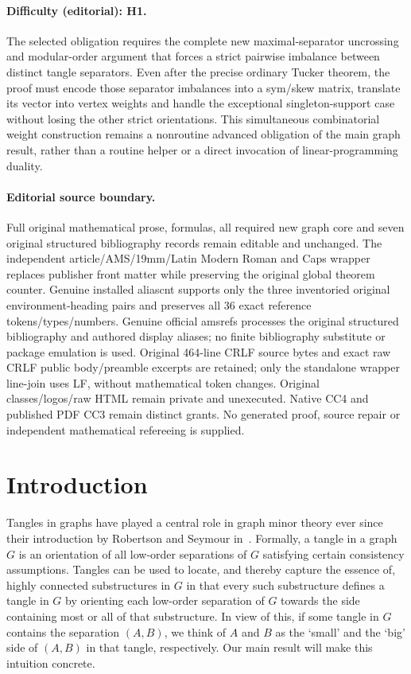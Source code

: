 \documentclass[11pt]{article}
\theoremstyle{definition}
\begin{document}
\paragraph{Difficulty (editorial): H1.} The selected obligation requires the complete new maximal-separator uncrossing and modular-order argument that forces a strict pairwise imbalance between distinct tangle separators. Even after the precise ordinary Tucker theorem, the proof must encode those separator imbalances into a sym/skew matrix, translate its vector into vertex weights and handle the exceptional singleton-support case without losing the other strict orientations. This simultaneous combinatorial weight construction remains a nonroutine advanced obligation of the main graph result, rather than a routine helper or a direct invocation of linear-programming duality.
\paragraph{Editorial source boundary.} Full original mathematical prose, formulas, all required new graph core and seven original structured bibliography records remain editable and unchanged. The independent article/AMS/19mm/Latin Modern Roman and Caps wrapper replaces publisher front matter while preserving the original global theorem counter. Genuine installed aliascnt supports only the three inventoried original environment-heading pairs and preserves all 36 exact reference tokens/types/numbers. Genuine official amsrefs processes the original structured bibliography and authored display aliases; no finite bibliography substitute or package emulation is used. Original 464-line CRLF source bytes and exact raw CRLF public body/preamble excerpts are retained; only the standalone wrapper line-join uses LF, without mathematical token changes. Original classes/logos/raw HTML remain private and unexecuted. Native CC4 and published PDF CC3 remain distinct grants. No generated proof, source repair or independent mathematical refereeing is supplied.
\clearpage
\section{Introduction}

Tangles in graphs have played a central role in graph minor theory ever since their introduction by Robertson and Seymour in~\cite{GMX}. Formally, a tangle in a graph $ G $ is an orientation of all low-order separations of $ G $ satisfying certain consistency assumptions. Tangles can be used to locate, and thereby capture the essence of, highly connected substructures in $ G $ in that every such substructure defines a tangle in $ G $ by orienting each low-order separation of $ G $ towards the side containing most or all of that substructure. In view of this, if some tangle in $ G $ contains the separation $ (A,B) $, we  think of $ A $ and $ B $ as the `small' and the `big' side of $ (A,B) $ in that tangle, respectively. Our main result will make this intuition concrete.
\end{document}
